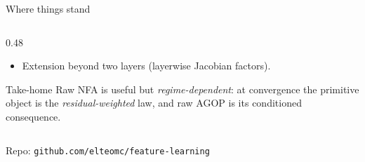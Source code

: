 \documentclass[10pt,aspectratio=169]{beamer}
\begin{document}
\begin{frame}{Where things stand}
\begin{columns}[T,onlytextwidth]
\begin{column}{0.48\textwidth}
\begin{itemize}
        \item Extension beyond two layers (layerwise Jacobian factors).
      \end{itemize}
      \vspace{4pt}
      \begin{ibox}{Take-home}
        Raw NFA is useful but \emph{regime-dependent}: at convergence the primitive object is the \emph{residual-weighted} law, and raw AGOP is its conditioned consequence.
      \end{ibox}
      \vfill\null
    \end{column}
  \end{columns}
  \vspace{4pt}
  \centerline{\scriptsize\color{nicegray}Repo: \texttt{github.com/elteomc/feature-learning}}
\end{frame}
\end{document}
